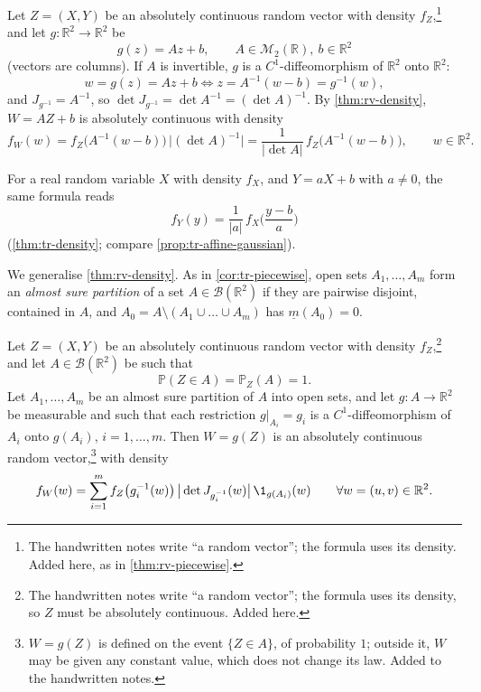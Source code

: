 \begin{example}\label{cor:rv-linear}
Let $Z=(X,Y)$ be an absolutely continuous random vector with density $f_Z$,\footnote{The handwritten
notes write ``a random vector''; the formula uses its density. Added here, as in
\cref{thm:rv-piecewise}.} and let
$g:\mathbb R^2\to\mathbb R^2$ be
\[
  g(z)=Az+b,\qquad A\in\mathcal M_2(\mathbb R),\ b\in\mathbb R^2
\]
(vectors are columns). If $A$ is invertible, $g$ is a $C^1$-diffeomorphism of $\mathbb R^2$ onto
$\mathbb R^2$:
\[
  w=g(z)=Az+b\iff z=A^{-1}(w-b)=g^{-1}(w),
\]
and $J_{g^{-1}}=A^{-1}$, so $\det J_{g^{-1}}=\det A^{-1}=(\det A)^{-1}$. By \cref{thm:rv-density},
$W=AZ+b$ is absolutely continuous with density
\[
  f_W(w)=f_Z\big(A^{-1}(w-b)\big)\,\big|(\det A)^{-1}\big|=\frac1{|\det A|}\,f_Z\big(A^{-1}(w-b)\big),
  \qquad w\in\mathbb R^2 .
\]
\end{example}

\begin{remark}\label{rem:rv-affine-1d}
For a real random variable $X$ with density $f_X$, and $Y=aX+b$ with $a\ne0$, the same formula
reads
\[
  f_Y(y)=\frac1{|a|}\,f_X\Big(\frac{y-b}a\Big)
\]
(\cref{thm:tr-density}; compare \cref{prop:tr-affine-gaussian}).
\end{remark}

We generalise \cref{thm:rv-density}. As in \cref{cor:tr-piecewise}, open sets $A_1,\dots,A_m$ form an
\emph{almost sure partition} of a set $A\in\mathcal B(\mathbb R^2)$ if they are pairwise disjoint,
contained in $A$, and $A_0=A\setminus(A_1\cup\dots\cup A_m)$ has $\underline m(A_0)=0$.

\begin{theorem}\label{thm:rv-piecewise}
Let $Z=(X,Y)$ be an absolutely continuous random vector with density $f_Z$,\footnote{The handwritten
notes write ``a random vector''; the formula uses its density, so $Z$ must be absolutely continuous.
Added here.} and let $A\in\mathcal B(\mathbb R^2)$ be such that
\[
  \mathbb P(Z\in A)=\mathbb P_Z(A)=1 .
\]
Let $A_1,\dots,A_m$ be an almost sure partition of $A$ into open sets, and let $g:A\to\mathbb R^2$ be
measurable and such that each restriction $g|_{A_i}=g_i$ is a $C^1$-diffeomorphism of $A_i$ onto
$g(A_i)$, $i=1,\dots,m$. Then $W=g(Z)$ is an absolutely continuous random vector,\footnote{$W=g(Z)$
is defined on the event $\{Z\in A\}$, of probability $1$; outside it, $W$ may be given any constant
value, which does not change its law. Added to the handwritten notes.} with density
\[
  f_W(w)=\sum_{i=1}^mf_Z\big(g_i^{-1}(w)\big)\,\big|\det J_{g_i^{-1}}(w)\big|\,\1_{g(A_i)}(w)
  \qquad\forall w=(u,v)\in\mathbb R^2 .
\]
\end{theorem}

